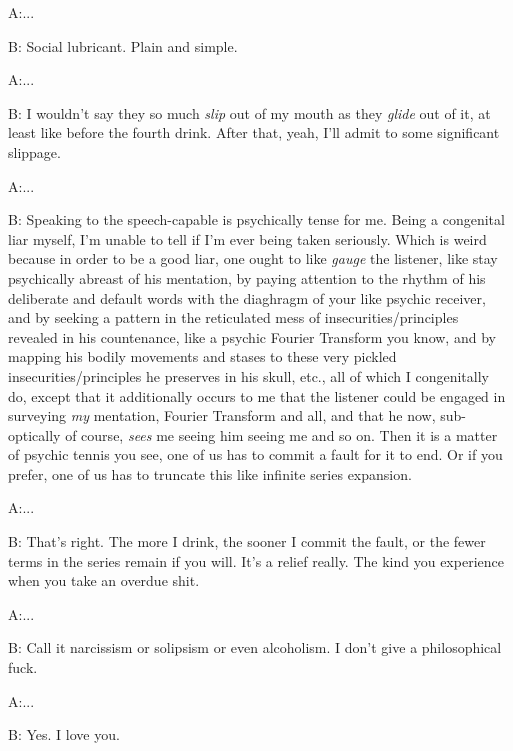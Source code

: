 \documentclass{article}
\begin{document}
\newline

A:...

B: Social lubricant. Plain and simple.
\newline
\newline

A:...

B: I wouldn't say they so much \textit{slip} out of my mouth as they
\textit{glide} out of it, at least like before the fourth drink. After
that, yeah, I'll admit to some significant slippage. \newline
\newline
\newline

A:...

B: Speaking to the speech-capable is psychically tense for me. Being
a congenital liar myself, I'm unable to tell if I'm ever being taken
seriously. Which is weird because in order to be a good liar, one ought
to like \textit{gauge} the listener, like stay psychically abreast of
his mentation, by paying attention to the rhythm of his deliberate and
default words with the diaghragm of your like psychic receiver, and by
seeking a pattern in the reticulated mess of insecurities/principles
revealed in his countenance, like a psychic Fourier Transform you know,
and by mapping his bodily movements and stases to these very pickled
insecurities/principles he preserves in his skull, etc., all of which
I congenitally do, except that it additionally occurs to me that the
listener could be engaged in surveying \textit{my} mentation,
Fourier Transform and all, and that he now, sub-optically of course,
\textit{sees} me seeing him seeing me and so on. Then it is a matter of
psychic tennis you see, one of us has to commit a fault for it to end.
Or if you prefer, one of us has to truncate this like infinite series
expansion. \newline \newline

A:...

B: That's right. The more I drink, the sooner I commit the fault, or the
fewer terms in the series remain if you will. It's a relief really. The
kind you experience when you take an overdue shit. \newline \newline

A:...

B: Call it narcissism or solipsism or even alcoholism. I don't give
a philosophical fuck.
\newline
\newline

A:...

B: Yes. I love you.
\newline
\newline
\end{document}
